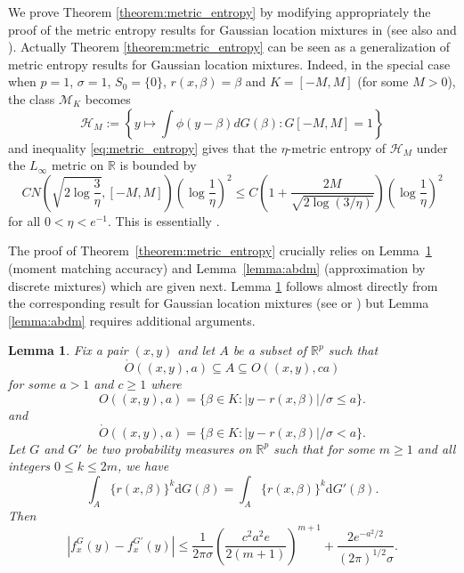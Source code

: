 \documentclass[11pt]{article}
\numberwithin{equation}{section}
\newtheorem{lemma}{Lemma}[section]
\newcommand{\RS}{\mathbb{R}}
\begin{document}
\begin{appendices}
We prove Theorem \ref{theorem:metric_entropy} by modifying appropriately the proof of the metric entropy results for Gaussian location mixtures in \citet{zhang2009generalized} (see also \citet{ghosal2007posterior} and \citet{saha2020nonparametric}). Actually Theorem \ref{theorem:metric_entropy} can be seen as a generalization of metric entropy results for Gaussian location mixtures. Indeed, in the special case when $p = 1$, $\sigma = 1$,   $S_0 = \{0\}$, $r(x, \beta) = \beta$ and $K = [-M, M]$ (for some $M > 0$), the class $\mathcal{M}_K$ becomes
  \begin{equation*}
    \mathcal{H}_M := \left\{y \mapsto \int \phi(y - \beta) dG(\beta) : G[-M, M] = 1 \right\}
  \end{equation*}
  and inequality \eqref{eq:metric_entropy}  gives that the $\eta$-metric entropy of $\mathcal{H}_M$ under the $L_{\infty}$ metric on $\mathbb{R}$ is bounded by
  \begin{equation*}
C N\left(\sqrt{2 \log \frac{3}{\eta}}, [-M, M] \right) \left(\log \frac{1}{\eta} \right)^{2} \leq    C \left(1 + \frac{2M}{\sqrt{2 \log (3/\eta)}} \right) \left(\log \frac{1}{\eta} \right)^2
  \end{equation*}
for all $0 < \eta < e^{-1}$. This is essentially \citet[inequality (5.8)]{zhang2009generalized}.  


The proof of Theorem~\ref{theorem:metric_entropy} crucially relies on Lemma~\ref{lemma:mml} (moment matching accuracy) and Lemma~\ref{lemma:abdm} (approximation by discrete mixtures) which are given next. Lemma \ref{lemma:mml} follows almost directly from the corresponding result for Gaussian location mixtures (see \citet[Lemma 1]{jiang2009general} or \citet[Lemma D.2]{saha2020nonparametric}) but Lemma \ref{lemma:abdm} requires additional arguments. 

\begin{lemma}
  Fix a pair $(x, y)$ and let $A$ be a subset of $\RS^p$ such that
  \[
\mathring{O}((x,y), a) \subseteq A \subseteq O((x,y), ca)
\]
for some $a>1$ and $c \geq 1$ where
\[
O((x,y), a) = \{ \beta \in  K: | y - r(x,\beta) |/\sigma \leq  a \}.
\]
and
\[
\mathring{O}((x,y), a) = \{ \beta \in K: | y -r(x,\beta)| /\sigma<  a \}. 
\]
Let $G$ and $G'$ be two probability measures on $\RS^p$ such that for some $m \geq 1$ and all integers $0\leq k \leq 2m$, we have
\begin{equation}
\int_A \{r(x,\beta)\}^k \mathrm{d} G(\beta) = \int_A \{r(x,\beta)\}^k \mathrm{d} G'(\beta).
\label{eq:mml_equal}
\end{equation}
Then 
\begin{equation}
|f^G_x(y) - f^{G'}_x(y)|\leq \frac{1}{2 \pi \sigma } \left( \frac{c^2a^2e}{2(m+1)}\right)^{m+1}   + \frac{2e^{-a^2/2}}{(2\pi)^{1/2}\sigma}.
\label{eq:mml_result}
\end{equation}
\label{lemma:mml}
\end{lemma}


\end{appendices}
\end{document}
